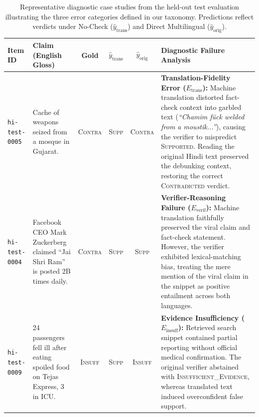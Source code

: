 \begin{table}[t]
\centering
\small
\caption{Representative diagnostic case studies from the held-out test evaluation illustrating the three error categories defined in our taxonomy. Predictions reflect verdicts under No-Check ($\hat{y}_{\text{trans}}$) and Direct Multilingual ($\hat{y}_{\text{orig}}$).}
\label{tab:case-studies}
\begin{tabularx}{\textwidth}{lp{}cccX}
\toprule
\textbf{Item ID} & \textbf{Claim (English Gloss)} & \textbf{Gold} & $\hat{y}_{\text{trans}}$ & $\hat{y}_{\text{orig}}$ & \textbf{Diagnostic Failure Analysis} \\
\midrule
\texttt{hi-test-0005} & Cache of weapons seized from a mosque in Gujarat. & \textsc{Contra} & \textsc{Supp} & \textsc{Contra} & \textbf{Translation-Fidelity Error ($E_{\text{trans}}$):} Machine translation distorted fact-check context into garbled text (\emph{``Chamim f{\"u}ck welded from a moustik...''}), causing the verifier to mispredict \textsc{Supported}. Reading the original Hindi text preserved the debunking context, restoring the correct \textsc{Contradicted} verdict. \\
\addlinespace
\texttt{hi-test-0004} & Facebook CEO Mark Zuckerberg claimed ``Jai Shri Ram'' is posted 2B times daily. & \textsc{Contra} & \textsc{Supp} & \textsc{Supp} & \textbf{Verifier-Reasoning Failure ($E_{\text{verif}}$):} Machine translation faithfully preserved the viral claim and fact-check statement. However, the verifier exhibited lexical-matching bias, treating the mere mention of the viral claim in the snippet as positive entailment across both languages. \\
\addlinespace
\texttt{hi-test-0009} & 24 passengers fell ill after eating spoiled food on Tejas Express, 3 in ICU. & \textsc{Insuff} & \textsc{Supp} & \textsc{Insuff} & \textbf{Evidence Insufficiency ($E_{\text{insuff}}$):} Retrieved search snippet contained partial reporting without official medical confirmation. The original verifier abstained with \textsc{Insufficient\_Evidence}, whereas translated text induced overconfident false support. \\
\bottomrule
\end{tabularx}
\end{table}
